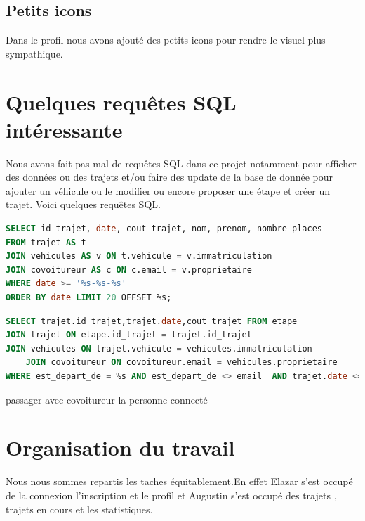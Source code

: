 	\subsection{Petits icons}
		Dans le profil nous avons ajouté des petits icons pour rendre le visuel plus sympathique. 
	
	\section{Quelques requêtes SQL intéressante}
		Nous avons fait pas mal de requêtes SQL dans ce projet notamment pour afficher des données ou des trajets et/ou faire des update de la base de donnée pour ajouter un véhicule ou le modifier ou encore proposer une étape et créer un trajet. Voici quelques requêtes SQL.
		\begin{lstlisting}[language=SQL]
SELECT id_trajet, date, cout_trajet, nom, prenom, nombre_places 
FROM trajet AS t 
JOIN vehicules AS v ON t.vehicule = v.immatriculation 
JOIN covoitureur AS c ON c.email = v.proprietaire
WHERE date >= '%s-%s-%s'
ORDER BY date LIMIT 20 OFFSET %s;
		\end{lstlisting}
		
		\begin{lstlisting}[language=SQL]
SELECT trajet.id_trajet,trajet.date,cout_trajet FROM etape
JOIN trajet ON etape.id_trajet = trajet.id_trajet 
JOIN vehicules ON trajet.vehicule = vehicules.immatriculation 
	JOIN covoitureur ON covoitureur.email = vehicules.proprietaire
WHERE est_depart_de = %s AND est_depart_de <> email  AND trajet.date <= %s  AND trajet.status = True ORDER BY trajet.date;

		\end{lstlisting}
		passager avec covoitureur la personne connecté
	
\section{Organisation du travail}
	Nous nous sommes repartis les taches équitablement.En effet Elazar s'est occupé de la connexion l'inscription et le profil et Augustin s'est occupé des trajets , trajets en cours et les statistiques.
		

		
		
		
		
		
		
		
		
		
		
		
		
		
		
		
		
		
		
		
		
		
		
		
		
		